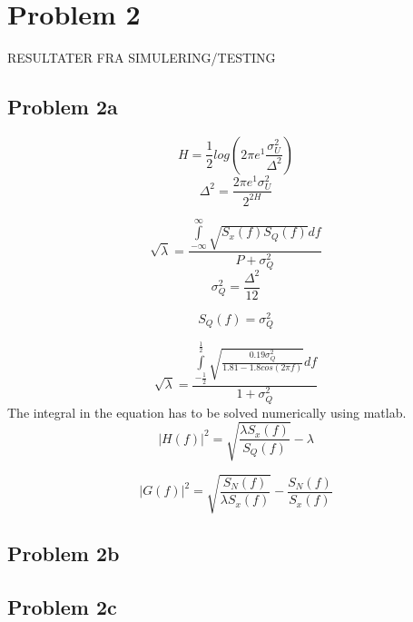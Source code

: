 \chapter{Problem 2}
RESULTATER FRA SIMULERING/TESTING

\section{Problem 2a}

	\begin{equation}
		H=\frac{1}{2}log(2\pi e^1\frac{\sigma ^2 _U}{\Delta ^2})
	\end{equation}
	\begin{equation}
		\Delta ^2=\frac{2\pi e^1\sigma ^2 _U}{2^{2H}}
	\end{equation}
	
	\begin{equation}
		\sqrt{\lambda}=\frac{\int\limits_{-\infty}^{\infty}\sqrt{S_x(f)S_Q(f)}df}{P+\sigma^2_Q}
	\end{equation}
	\begin{equation}
		\sigma^2_Q=\frac{\Delta^2}{12}
	\end{equation}
	
	\begin{equation}
		S_Q(f)=\sigma^2_Q
	\end{equation}
	

	\begin{equation}
		\sqrt{\lambda}=\frac{\int\limits_{-\frac{1}{2}}^{\frac{1}{2}}\sqrt{\frac{0.19\sigma^2_Q}{1.81-1.8cos(2\pi f)}}df}{1+\sigma^2_Q}
	\end{equation}
	The integral in the equation has to be solved numerically using matlab.
	\begin{equation}
		|H(f)|^2=\sqrt{\frac{\lambda S_x(f)}{S_Q(f)}}-\lambda
	\end{equation}
	
	\begin{equation}
		|G(f)|^2=\sqrt{\frac{S_N(f)}{\lambda S_x(f)}}-\frac{S_N(f)}{S_x(f)}
	\end{equation}
	
	
	

\section{Problem 2b}

\section{Problem 2c}

